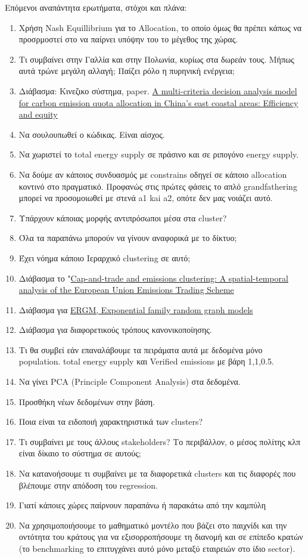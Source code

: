 \documentclass[a4paper,twoside,10pt]{article}
\begin{document}
Επόμενοι αναπάντητα ερωτήματα, στόχοι και πλάνα:
\begin{enumerate}
	\item Χρήση Nash Equillibrium για το Allocation, το οποίο όμως θα πρέπει κάπως να προσρμοστεί στο να παίρνει υπόψην του το μέγεθος της χώρας. 
	\item Τι συμβαίνει στην Γαλλία και στην Πολωνία, κυρίως στα δωρεάν τους. Μήπως αυτά τρώνε μεγάλη αλλαγή; Παίζει ρόλο η πυρηνική ενέργεια;
	\item Διάβασμα: Κινεζικο σύστημα, paper. \href{https://drive.google.com/file/d/1W-kgF_saksU7svNzT8C-sPA2I0IdUZDN/view?usp=sharing}{A multi-criteria decision analysis model for carbon emission quota
		allocation in China's east coastal areas: Efficiency and equity}
	\item Να σουλουπωθεί ο κώδικας. Είναι αίσχος.
	\item Να χωριστεί το total energy supply σε πράσινο και σε ριπογόνο energy supply. 
	\item Να δούμε αν κάποιος συνδυασμός με constrains οδηγεί σε κάποιο allocation κοντινό στο πραγματικό. Προφανώς στις πρώτες φάσεις το απλό grandfathering μπορεί να προσομοιωθεί με στενά a1 kai a2, οπότε δεν μας νοιάζει αυτό.
	\item Υπάρχουν κάποιας μορφής αντιπρόσωποι μέσα στα cluster?
	\item Όλα τα παραπάνω μπορούν να γίνουν αναφορικά με το δίκτυο;
	\item Έχει νόημα κάποιο Ιεραρχικό clustering σε αυτό;
	\item Διάβασμα το "\href{https://drive.google.com/file/d/1GYLMPbl6zlnTY73ovF7P7_sg-epzIKVL/view?usp=sharing}{Cap-and-trade and emissions clustering: A spatial-temporal analysis of the
		European Union Emissions Trading Scheme}
	\item Διάβασμα για \href{https://en.wikipedia.org/wiki/Exponential_family_random_graph_models}{ERGM, Exponential family random graph models}
	\item Διάβασμα για διαφορετικούς τρόπους κανονικοποίησης.
	\item Τι θα συμβεί εάν επαναλάβουμε τα πειράματα αυτά με δεδομένα μόνο population. total energy supply και Verified emissions με βάρη 1,1,0.5.
	\item Να γίνει PCA (Principle Component Analysis) στα δεδομένα. 
	\item Προσθήκη νέων δεδομένων στην βάση. 
	\item Ποια είναι τα ειδοποιή χαρακτηριστικά των clusters?
	\item Τι συμβαίνει με τους άλλους stakeholders? Το περιβάλλον, ο μέσος πολίτης κλπ είναι δίκαιο το σύστημα σε αυτούς;
	\item Να κατανοήσουμε τι συμβαίνει με τα διαφορετικά clusters και τις διαφορές που βλέπουμε στην απόδοση του regression. \item Γιατί κάποιες χώρες παίρνουν παραπάνω ή παρακάτω από την καμπύλη
	\item Nα χρησιμοποιήσουμε το μαθηματικό μοντέλο που βάζει στο παιχνίδι και την οντότητα του κράτους για να εξισορροπήσουμε τη διανομή και σε επίπεδο κρατών (το benchmarking το επιτυγχάνει αυτό μόνο μεταξύ εταιρειών στο ίδιο sector). 
	

\end{enumerate}
\end{document}
